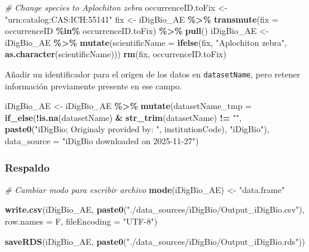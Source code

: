 \documentclass[sn-apa,pdflatex]{sn-jnl}
\newenvironment{Shaded}{\begin{snugshade}}{\end{snugshade}}
\newcommand{\AttributeTok}[1]{\textcolor[rgb]{0.13,0.29,0.53}{#1}}
\newcommand{\CommentTok}[1]{\textcolor[rgb]{0.56,0.35,0.01}{\textit{#1}}}
\newcommand{\FunctionTok}[1]{\textcolor[rgb]{0.13,0.29,0.53}{\textbf{#1}}}
\newcommand{\NormalTok}[1]{#1}
\newcommand{\OtherTok}[1]{\textcolor[rgb]{0.56,0.35,0.01}{#1}}
\newcommand{\SpecialCharTok}[1]{\textcolor[rgb]{0.81,0.36,0.00}{\textbf{#1}}}
\newcommand{\StringTok}[1]{\textcolor[rgb]{0.31,0.60,0.02}{#1}}
\begin{document}
\begin{Shaded}
\begin{Highlighting}[]
\CommentTok{\# Change species to Aplochiton zebra}
\NormalTok{occurrenceID.toFix }\OtherTok{\textless{}{-}} \StringTok{"urn:catalog:CAS:ICH:55141"}
\NormalTok{fix }\OtherTok{\textless{}{-}}\NormalTok{ iDigBio\_AE }\SpecialCharTok{\%\textgreater{}\%}
    \FunctionTok{transmute}\NormalTok{(}\AttributeTok{fix =}\NormalTok{ occurrenceID }\SpecialCharTok{\%in\%}\NormalTok{ occurrenceID.toFix) }\SpecialCharTok{\%\textgreater{}\%}
    \FunctionTok{pull}\NormalTok{()}
\NormalTok{iDigBio\_AE }\OtherTok{\textless{}{-}}\NormalTok{ iDigBio\_AE }\SpecialCharTok{\%\textgreater{}\%}
    \FunctionTok{mutate}\NormalTok{(}\AttributeTok{scientificName =} \FunctionTok{ifelse}\NormalTok{(fix, }\StringTok{"Aplochiton zebra"}\NormalTok{, }\FunctionTok{as.character}\NormalTok{(scientificName)))}
\FunctionTok{rm}\NormalTok{(fix, occurrenceID.toFix)}
\end{Highlighting}
\end{Shaded}

Añadir un identificador para el origen de los datos en
\texttt{datasetName}, pero retener información previamente presente en
ese campo.

\begin{Shaded}
\begin{Highlighting}[]
\NormalTok{iDigBio\_AE }\OtherTok{\textless{}{-}}\NormalTok{ iDigBio\_AE }\SpecialCharTok{\%\textgreater{}\%}
    \FunctionTok{mutate}\NormalTok{(}\AttributeTok{datasetName\_tmp =} \FunctionTok{if\_else}\NormalTok{(}\SpecialCharTok{!}\FunctionTok{is.na}\NormalTok{(datasetName) }\SpecialCharTok{\&} \FunctionTok{str\_trim}\NormalTok{(datasetName) }\SpecialCharTok{!=}
        \StringTok{""}\NormalTok{, }\FunctionTok{paste0}\NormalTok{(}\StringTok{"iDigBio; Originaly provided by: "}\NormalTok{, institutionCode),}
        \StringTok{"iDigBio"}\NormalTok{), }\AttributeTok{data\_source =} \StringTok{"iDigBio downloaded on 2025{-}11{-}27"}\NormalTok{)}
\end{Highlighting}
\end{Shaded}

\subsubsection{Respaldo}\label{respaldo-7}

\begin{Shaded}
\begin{Highlighting}[]
\CommentTok{\# Cambiar modo para escribir archivo}
\FunctionTok{mode}\NormalTok{(iDigBio\_AE) }\OtherTok{\textless{}{-}} \StringTok{"data.frame"}

\FunctionTok{write.csv}\NormalTok{(iDigBio\_AE, }\FunctionTok{paste0}\NormalTok{(}\StringTok{"./data\_sources/iDigBio/Output\_iDigBio.csv"}\NormalTok{),}
    \AttributeTok{row.names =}\NormalTok{ F, }\AttributeTok{fileEncoding =} \StringTok{"UTF{-}8"}\NormalTok{)}

\FunctionTok{saveRDS}\NormalTok{(iDigBio\_AE, }\FunctionTok{paste0}\NormalTok{(}\StringTok{"./data\_sources/iDigBio/Output\_iDigBio.rds"}\NormalTok{))}
\end{Highlighting}
\end{Shaded}
\end{document}
